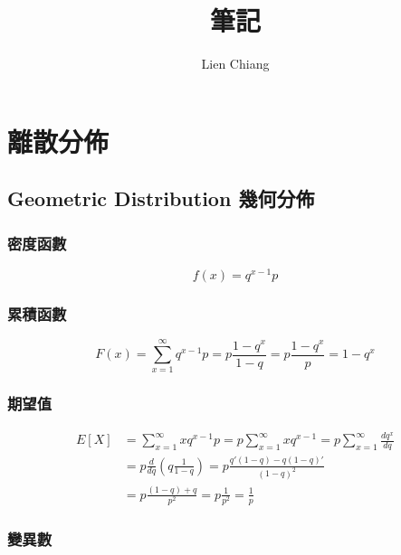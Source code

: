 \documentclass{article}
\title{筆記}
\author{Lien Chiang}
\date{}
\begin{document}
\maketitle

\section{離散分佈}

\bigskip
\subsection{Geometric Distribution 幾何分佈}

\bigskip
\subsubsection{密度函數}
\[ f(x)=q^{x-1}p \]

\subsubsection{累積函數}
\[ F(x)=\sum_{x=1}^\infty{q^{x-1}p}
       =p\frac{1-q^x}{1-q}
       =p\frac{1-q^x}{p}
       =1-q^x \]

\subsubsection{期望值}
\begin{align*}
E[X]
& =  \sum_{x=1}^\infty{xq^{x-1}p}
  = p\sum_{x=1}^\infty{xq^{x-1}}
  = p\sum_{x=1}^\infty{\frac{dq^x}{dq}} \\
& = p\frac{d}{dq}(q\frac{1}{1-q})
  = p\frac{q'(1-q)-q(1-q)'}{(1-q)^2} \\
& = p\frac{(1-q)+q}{p^2}
  = p\frac{1}{p^2}
  =  \frac{1}{p}
\end{align*}

\clearpage

\subsubsection{變異數}
\end{document}
